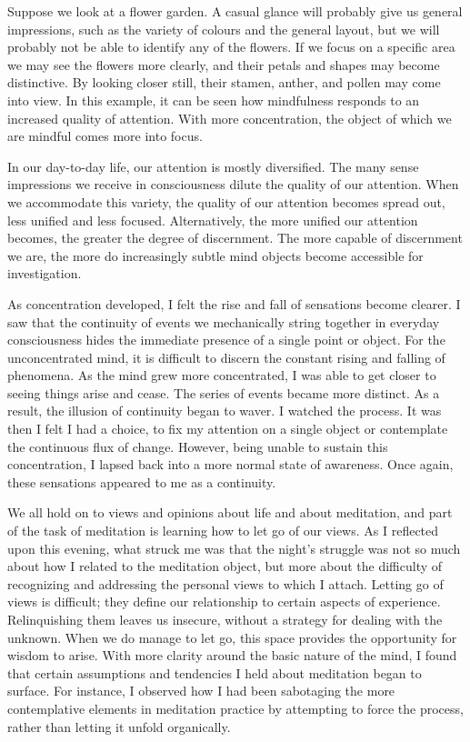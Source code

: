 Suppose we look at a flower garden. A casual glance will probably give
us general impressions, 
such as the variety of colours and the general layout, but we will
probably not be able to identify any of the flowers. If we focus on a
specific area we may see the flowers more clearly, and their petals and
shapes may become distinctive. By looking closer still, their stamen, 
anther, and pollen may come into view. In this example, it can be seen
how mindfulness responds to an increased quality of attention. With more
concentration, the object of which we are mindful comes more into focus. 

In our day-to-day life, our attention is mostly diversified. The many
sense impressions we receive in consciousness dilute the quality of our
attention. When we accommodate this variety, the quality of our
attention becomes spread out, less unified and less focused. 
Alternatively, the more unified our attention becomes, the greater the
degree of discernment. The more capable of discernment we are, the more
do increasingly subtle mind objects become accessible for investigation. 

As concentration developed, I felt the rise and fall of sensations
become clearer. I saw that the continuity of events we mechanically
string together in everyday consciousness hides the immediate presence
of a single point or object. For the unconcentrated mind, it is
difficult to discern the constant rising and falling of phenomena. As
the mind grew more concentrated, I was able to get closer to seeing
things arise and cease. The series of events became more distinct. As a
result, the illusion of continuity began to waver. I watched the
process. It was then I felt I had a choice, to fix my attention on a
single object or contemplate the continuous flux of change. However, 
being unable to sustain this concentration, I lapsed back into a more
normal state of awareness. Once again, these sensations appeared to me
as a continuity. 

We all hold on to views and opinions about life and about meditation, 
and part of the task of meditation is learning how to let go of our
views. As I reflected upon this evening, what struck me was that the
night's struggle was not so much about how I related to the meditation
object, but more about the difficulty of recognizing and addressing the
personal views to which I attach. Letting go of views is difficult; they
define our relationship to certain aspects of experience. Relinquishing
them leaves us insecure, without a strategy for dealing with the
unknown. When we do manage to let go, this space provides the
opportunity for wisdom to arise. With more clarity around the basic
nature of the mind, I found that certain assumptions and tendencies I
held about meditation began to surface. For instance, I observed how I
had been sabotaging the more contemplative elements in meditation
practice by attempting to force the process, rather than letting it
unfold organically. 

